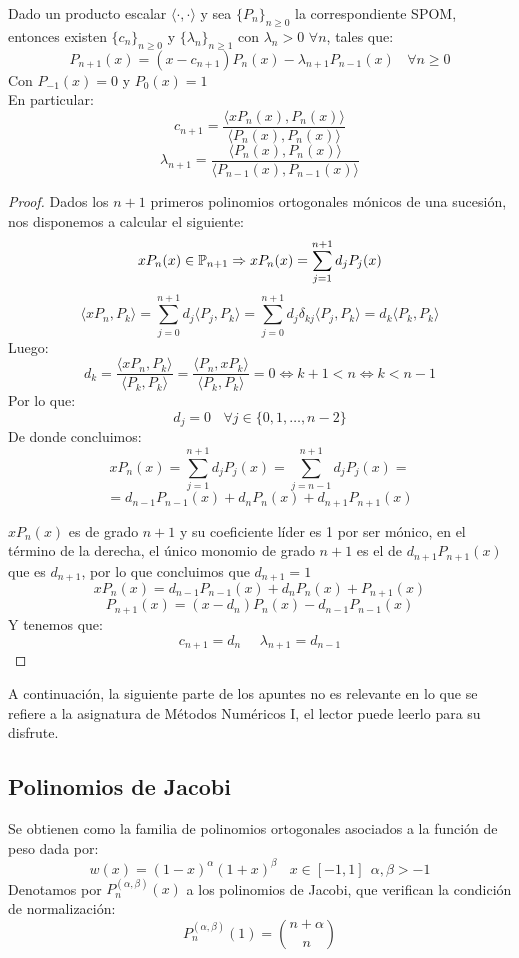 \begin{teo}
    Dado un producto escalar $\langle \cdot,\cdot \rangle$ y sea $\{P_n\}_{n \geq 0}$ la correspondiente SPOM, entonces existen
    $\{c_n\}_{n \geq 0}$ y $\{\lambda_n\}_{n\geq 1}$ con $\lambda_n>0$ $\forall n$, tales que:
    $$P_{n+1}(x) = (x-c_{n+1})P_n(x) - \lambda_{n+1}P_{n-1}(x)~~~~\forall n \geq 0$$
    Con $P_{-1}(x) = 0$ y $P_0(x) = 1$\\

    \noindent
    En particular:
    $$c_{n+1} = \dfrac{\langle xP_n(x), P_n(x) \rangle}{\langle P_n(x),P_n(x) \rangle}$$
    $$\lambda_{n+1} = \dfrac{\langle P_n(x), P_n(x) \rangle}{\langle P_{n-1}(x),P_{n-1}(x) \rangle}$$
\end{teo}
\begin{proof}
    Dados los $n+1$ primeros polinomios ortogonales mónicos de una sucesión, nos disponemos a calcular el siguiente:
    $$xP_n(x) \in \mathbb{P}_{n+1} \Rightarrow xP_n(x) = \sum_{j=1}^{n+1} d_jP_j(x)$$
    $$\langle xP_n, P_k \rangle = \sum_{j=0}^{n+1} d_j \langle P_j, P_k \rangle = \sum_{j=0}^{n+1} d_j \delta_{kj} \langle P_j, P_k \rangle
        = d_k \langle P_k, P_k \rangle$$
    Luego:
    $$d_k = \dfrac{\langle xP_n, P_k \rangle}{\langle P_k, P_k \rangle} = \dfrac{\langle P_n, xP_k \rangle}
        {\langle P_k, P_k \rangle} = 0 \Leftrightarrow k+1<n \Leftrightarrow k<n-1$$
    Por lo que:
    $$d_j = 0~~~~\forall j \in \{0, 1, \ldots, n-2\}$$
    De donde concluimos:
    $$xP_n(x) = \sum_{j=1}^{n+1} d_jP_j(x) = \sum_{j=n-1}^{n+1} d_jP_j(x) =$$
    $$=d_{n-1}P_{n-1}(x) + d_nP_n(x) + d_{n+1}P_{n+1}(x)$$

    \noindent
    $xP_n(x)$ es de grado $n+1$ y su coeficiente líder es 1 por ser mónico, en el término de la derecha, el único
    monomio de grado $n+1$ es el de $d_{n+1}P_{n+1}(x)$ que es $d_{n+1}$, por lo que concluimos que $d_{n+1}=1$
    $$xP_n(x)=d_{n-1}P_{n-1}(x) + d_nP_n(x) + P_{n+1}(x)$$
    $$P_{n+1}(x) = (x-d_n)P_n(x) - d_{n-1}P_{n-1}(x)$$
    Y tenemos que:
    $$c_{n+1}=d_n~~~~~~\lambda_{n+1}=d_{n-1}$$
\end{proof}

\bigskip
\noindent
A continuación, la siguiente parte de los apuntes no es relevante en lo que se refiere a la asignatura de
Métodos Numéricos I, el lector puede leerlo para su disfrute.

\subsection{Polinomios de Jacobi}
\noindent
Se obtienen como la familia de polinomios ortogonales asociados a la función de peso dada por:
$$w(x) = (1-x)^\alpha(1+x)^\beta~~~~x \in [-1,1]~~\alpha, \beta > -1$$
Denotamos por $P_n^{(\alpha, \beta)}(x)$ a los polinomios de Jacobi, que verifican la condición de normalización:
$$P_n^{(\alpha, \beta)}(1) = \binom{n+\alpha}{n}$$

